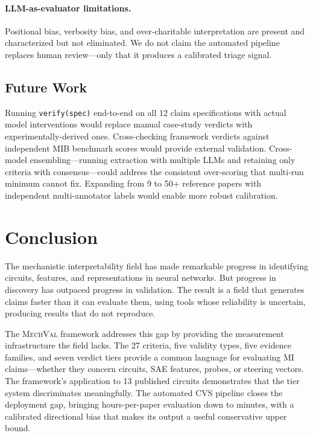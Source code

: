 \documentclass[10pt]{article}
\newcommand{\mechval}{\textsc{MechVal}}
\begin{document}
\paragraph{LLM-as-evaluator limitations.} Positional bias, verbosity bias, and over-charitable interpretation are present and characterized but not eliminated. We do not claim the automated pipeline replaces human review---only that it produces a calibrated triage signal.

\subsection{Future Work}

Running \texttt{verify(spec)} end-to-end on all 12 claim specifications with actual model interventions would replace manual case-study verdicts with experimentally-derived ones. Cross-checking framework verdicts against independent MIB benchmark scores would provide external validation. Cross-model ensembling---running extraction with multiple LLMs and retaining only criteria with consensus---could address the consistent over-scoring that multi-run minimum cannot fix. Expanding from 9 to 50+ reference papers with independent multi-annotator labels would enable more robust calibration.

\section{Conclusion}
\label{sec:conclusion}

The mechanistic interpretability field has made remarkable progress in identifying circuits, features, and representations in neural networks. But progress in discovery has outpaced progress in validation. The result is a field that generates claims faster than it can evaluate them, using tools whose reliability is uncertain, producing results that do not reproduce.

The \mechval{} framework addresses this gap by providing the measurement infrastructure the field lacks. The 27 criteria, five validity types, five evidence families, and seven verdict tiers provide a common language for evaluating MI claims---whether they concern circuits, SAE features, probes, or steering vectors. The framework's application to 13 published circuits demonstrates that the tier system discriminates meaningfully. The automated CVS pipeline closes the deployment gap, bringing hours-per-paper evaluation down to minutes, with a calibrated directional bias that makes its output a useful conservative upper bound.
\end{document}
